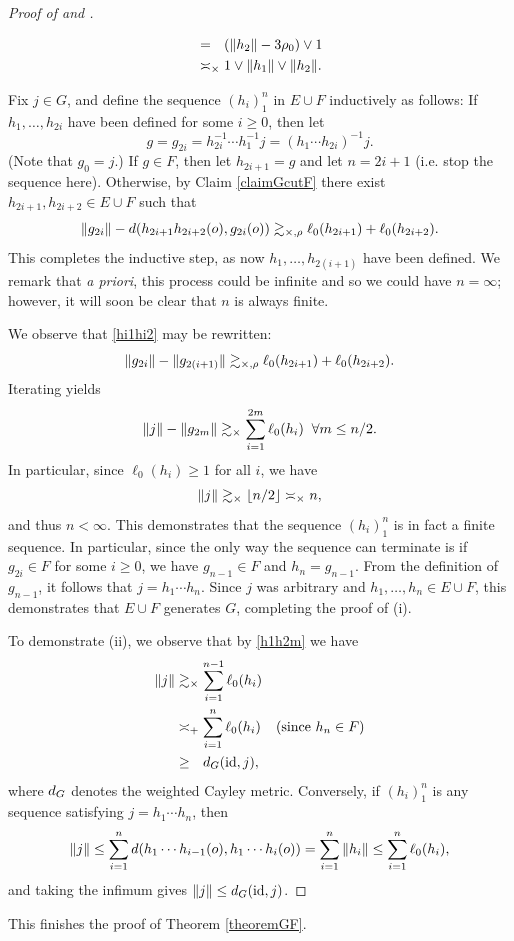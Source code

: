 \begin{proof}[Proof of  and ]
\begin{subproof}
\begin{itemize}
\begin{align*}
&=_\pt (\dogo{h_2} - 3\rho_0)\vee 1\\
&\asymp_\times 1\vee\dogo{h_1}\vee\dogo{h_2}.
\end{align*}
\end{itemize}
\end{subproof}
Fix $j\in G$, and define the sequence $(h_i)_1^n$ in $E\cup F$ inductively as follows: If $h_1,\ldots,h_{2i}$ have been defined for some $i\geq 0$, then let
\[
g = g_{2i} = h_{2i}^{-1}\cdots h_1^{-1} j = (h_1\cdots h_{2i})^{-1} j.
\]
(Note that $g_0 = j$.) If $g\in F$, then let $h_{2i + 1} = g$ and let $n = 2i + 1$ (i.e. stop the sequence here). Otherwise, by Claim \ref{claimGcutF} there exist $h_{2i + 1},h_{2i + 2}\in E\cup F$ such that
\begin{equation}
\label{hi1hi2}
\|g_{2i}\| - d(h_{2i + 1} h_{2i + 2}(o),g_{2i}(o)) \gtrsim_{\times,\rho} \ell_0(h_{2i + 1}) + \ell_0(h_{2i + 2}).
\end{equation}
This completes the inductive step, as now $h_1,\ldots,h_{2(i + 1)}$ have been defined. We remark that \emph{a priori}, this process could be infinite and so we could have $n = \infty$; however, it will soon be clear that $n$ is always finite.

We observe that \eqref{hi1hi2} may be rewritten:
\[
\|g_{2i}\| - \|g_{2(i + 1)}\| \gtrsim_{\times,\rho} \ell_0(h_{2i + 1}) + \ell_0(h_{2i + 2}).
\]
Iterating yields
\begin{equation}
\label{h1h2m}
\|j\| - \|g_{2m}\| \gtrsim_\times \sum_{i = 1}^{2m} \ell_0(h_i) \;\;\forall m \leq n/2.
\end{equation}
In particular, since $\ell_0(h_i) \geq 1$ for all $i$, we have
\[
\|j\| \gtrsim_\times \lfloor n/2\rfloor \asymp_\times n,
\]
and thus $n < \infty$. This demonstrates that the sequence $(h_i)_1^n$ is in fact a finite sequence. In particular, since the only way the sequence can terminate is if $g_{2i}\in F$ for some $i\geq 0$, we have $g_{n - 1}\in F$ and $h_n = g_{n - 1}$. From the definition of $g_{n - 1}$, it follows that $j = h_1\cdots h_n$. Since $j$ was arbitrary and $h_1,\ldots,h_n\in E\cup F$, this demonstrates that $E\cup F$ generates $G$, completing the proof of (i).

To demonstrate (ii), we observe that by \eqref{h1h2m} we have
\begin{align*}
\dogo j &\gtrsim_\times \sum_{i = 1}^{n - 1} \ell_0(h_i)\\
&\asymp_\plus \sum_{i = 1}^n \ell_0(h_i) \since{$h_n\in F$}\\
&\geq_\pt \dist_G(\id,j),
\end{align*}
where $d_G$ denotes the weighted Cayley metric. Conversely, if $(h_i)_1^n$ is any sequence satisfying $j = h_1\cdots h_n$, then
\[
\|j\| \leq \sum_{i = 1}^n d(h_1\cdots h_{i - 1}(o), h_1\cdots h_i(o)) = \sum_{i = 1}^n \|h_i\| \leq \sum_{i = 1}^n \ell_0(h_i),
\]
and taking the infimum gives $\|j\| \leq d_G(\mathrm{id},j)$.
\end{proof}
This finishes the proof of Theorem \ref{theoremGF}.

